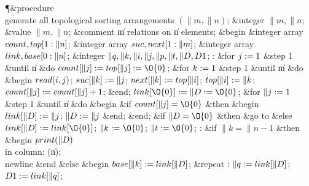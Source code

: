 \Y\P\4\&{procedure}
\\{generate all topological sorting arrangements} $(\|m,\|n)$;\6
\&{integer} $\|m, \|n$;\5
\&{value} $\|m, \|n$;\5
\&{comment} \|m relations on \|n elements;\6
\4\&{begin}
\&{integer array} $\\{count}, \\{top}[1:\|n]$;\6
\&{integer array} $\\{suc}, \\{next}[1:\|m]$;\6
\&{integer array} $\\{link}, \\{base}[0:\|n]$;\6
\&{integer} $\|q, \|k, \|i, \|j, \|p, \|t, \|D, \\{D1}$;\6
\0:\6
\&{for} $j\mathrel{:=} 1$ \&{step} 1 \&{until} \|n \&{do}
$\\{count}[\|j]\K \\{top}[\|j]\K \O{0}$;\6
\&{for} $k\mathrel{:=} 1$ \&{step} 1 \&{until} \|m \1\&{do}\6
\&{begin}\1
$\\{read}(i,j)$;\6
$\\{suc}[\|k] \mathrel{:=} \|j$;\5
$\\{next}[\|k]\mathrel{:=} \\{top}[\|i]$;\6
$\\{top}[\|i]\mathrel{:=} \|k$;\5
$\\{count}[\|j]\mathrel{:=} \\{count}[\|j]+1$;\6
\4\&{end};\2\2\6
$\\{link}[\O{0}]\K \|D \K \O{0}$;\6
\&{for} $\|j\mathrel{:=} 1$ \&{step} 1 \&{until} \|n \1\&{do}\6
\&{begin}\1
\&{if} $\\{count}[\|j] = \O{0}$ \1\&{then}\6
\&{begin} $\\{link}[\|D] \mathrel{:=} \|j$; $\|D \mathrel{:=} \|j$ \&{end};\2\6 %
\4\&{end};\2\2\6
\&{if} $\|D = \O{0}$ \&{then}
\&{go to}  \&{else} $\\{link}[\|D] \K \\{link}[\O{0}]$;\6
$\|k\K \O{0}$;\5
$\|t\K \O{0}$;\6
%
\0:
\&{if} $\|k = \|n - 1$ \1\&{then}\5
\&{begin}
$\\{print}(\|D)$ \\{in column}: (\|n);
\\{newline}\5
\&{end}\6
\4\&{else}
\&{begin}\1
%
$\\{base}[\|k] \mathrel{:=} \\{link}[\|D]$;\6
\1\&{repeat} :\6
$\|q\mathrel{:=} \\{link}[\|D]$;
$\\{D1} \mathrel{:=} \\{link}[\|q]$;\6
